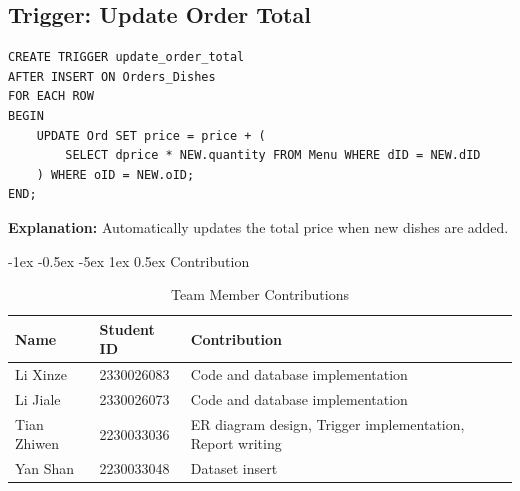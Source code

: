 \documentclass[12pt]{article}
\makeatletter
\renewcommand\section{\@startsection{section}{1}{\z@}%
    {-1ex \@plus -0.5ex \@minus -5ex} %
    {1ex \@plus 0.5ex} %
    {\normalfont\Large\bfseries}} %
\makeatother
\begin{document}
\subsection{Trigger: Update Order Total}
\begin{lstlisting}
CREATE TRIGGER update_order_total
AFTER INSERT ON Orders_Dishes
FOR EACH ROW
BEGIN
    UPDATE Ord SET price = price + (
        SELECT dprice * NEW.quantity FROM Menu WHERE dID = NEW.dID
    ) WHERE oID = NEW.oID;
END;
\end{lstlisting}
\textbf{Explanation:} Automatically updates the total price when new dishes are added.


\section{Contribution}

\begin{table}[htbp]
\centering
\caption{Team Member Contributions}
\begin{tabular}{llp{10cm}}
\toprule
\textbf{Name} & \textbf{Student ID} & \textbf{Contribution} \\
\midrule
Li Xinze & 2330026083 & Code and database implementation \\
Li Jiale & 2330026073 & Code and database implementation \\
Tian Zhiwen & 2230033036 & ER diagram design, Trigger implementation, Report writing \\
Yan Shan & 2230033048 & Dataset insert \\
\bottomrule
\end{tabular}
\end{table}
\end{document}
